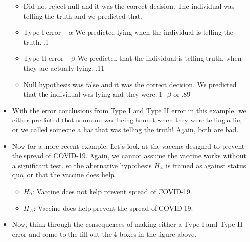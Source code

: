 \documentclass[
  letterpaper,
  DIV=11,
  numbers=noendperiod]{scrreprt}
\providecommand{\tightlist}{%
  \setlength{\itemsep}{0pt}\setlength{\parskip}{0pt}}\usepackage{longtable,booktabs,array}
\begin{document}
\begin{itemize}
  \begin{itemize}
  \tightlist
  \item
    Did not reject null and it was the correct decision. The individual
    was telling the truth and we predicted that.
  \item
    Type I error -- \(\alpha\) We predicted lying when the individual is
    telling the truth. .1
  \item
    Type II error -- \(\beta\) We predicted that the individual is
    telling truth, when they are actually lying. .11
  \item
    Null hypothesis was false and it was the correct decision. We
    predicted that the individual was lying and they were. 1- \(\beta\)
    or .89
  \end{itemize}
\item
  With the error conclusions from Type I and Type II error in this
  example, we either predicted that someone was being honest when they
  were telling a lie, or we called someone a liar that was telling the
  truth! Again, both are bad.
\item
  Now for a more recent example. Let's look at the vaccine designed to
  prevent the spread of COVID-19. Again, we cannot assume the vaccine
  works without a significant test, so the alternative hypothesis
  \(H_A\) is framed as against status quo, or that the vaccine does
  help.

  \begin{itemize}
  \tightlist
  \item
    \(H_0\): Vaccine does not help prevent spread of COVID-19.
  \item
    \(H_A\): Vaccine does help prevent the spread of COVID-19.\\
  \end{itemize}
\item
  Now, think through the consequences of making either a Type I and Type
  II error and come to the fill out the 4 boxes in the figure above.


\end{itemize}
\end{document}
